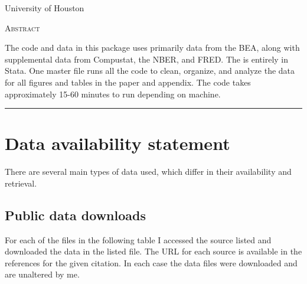 \documentclass[11pt]{article}
\begin{document}
\begin{titlepage}
\vspace{2in} \noindent {\large \today}

\vspace{.5in} 

\vspace{.25in} 

\vspace{.05in} \noindent University of Houston

\vfill \noindent \textsc{Abstract} \hrulefill

\vspace{.05in} \noindent The code and data in this package uses primarily data from the BEA, along with supplemental data from Compustat, the NBER, and FRED. The is entirely in Stata. One master file runs all the code to clean, organize, and analyze the data for all figures and tables in the paper and appendix. The code takes approximately 15-60 minutes to run depending on machine. 
 
\vspace{.1in} \hrule

\vspace{.1in} 
\end{titlepage}

\pagebreak 

\tableofcontents
\listoffigures
\listoftables

\section{Data availability statement}
\onehalfspacing There are several main types of data used, which differ in their availability and retrieval.

\subsection{Public data downloads}
For each of the files in the following table I accessed the source listed and downloaded the data in the listed file. The URL for each source is available in the references for the given citation. In each case the data files were downloaded and are unaltered by me.
\end{document}
